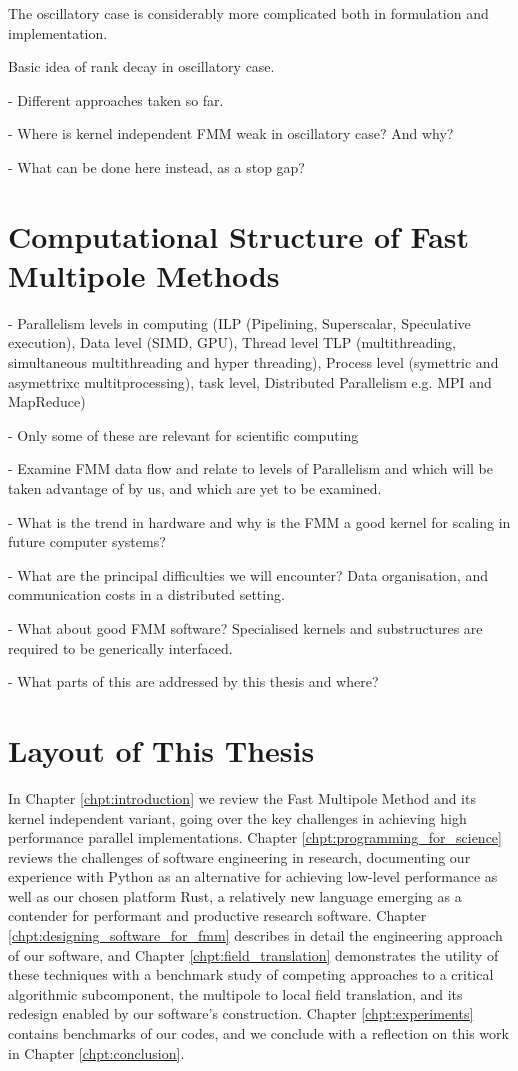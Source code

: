 The oscillatory case is considerably more complicated both in formulation and implementation.

Basic idea of rank decay in oscillatory case.

- Different approaches taken so far.


- Where is kernel independent FMM weak in oscillatory case? And why?

- What can be done here instead, as a stop gap?




\section{Computational Structure of Fast Multipole Methods}

- Parallelism levels in computing (ILP (Pipelining, Superscalar, Speculative execution), Data level (SIMD, GPU), Thread level TLP (multithreading, simultaneous multithreading and hyper threading), Process level (symettric and asymettrixc multitprocessing), task level, Distributed Parallelism e.g. MPI and MapReduce)

- Only some of these are relevant for scientific computing

- Examine FMM data flow and relate to levels of Parallelism and which will be taken advantage of by us, and which are yet to be examined.


- What is the trend in hardware and why is the FMM a good kernel for scaling in future computer systems?

- What are the principal difficulties we will encounter? Data organisation, and communication costs in a distributed setting.

- What about good FMM software? Specialised kernels and substructures are required to be generically interfaced.

- What parts of this are addressed by this thesis and where?


\section{Layout of This Thesis}

In Chapter \ref{chpt:introduction} we review the Fast Multipole Method and its kernel independent variant, going over the key challenges in achieving high performance parallel implementations. Chapter \ref{chpt:programming_for_science} reviews the challenges of software engineering in research, documenting our experience with Python as an alternative for achieving low-level performance as well as our chosen platform Rust, a relatively new language emerging as a contender for performant and productive research software. Chapter \ref{chpt:designing_software_for_fmm} describes in detail the engineering approach of our software, and Chapter \ref{chpt:field_translation} demonstrates the utility of these techniques with a benchmark study of competing approaches to a critical algorithmic subcomponent, the multipole to local field translation, and its redesign enabled by our software's construction. Chapter \ref{chpt:experiments} contains benchmarks of our codes, and we conclude with a reflection on this work in Chapter \ref{chpt:conclusion}.
